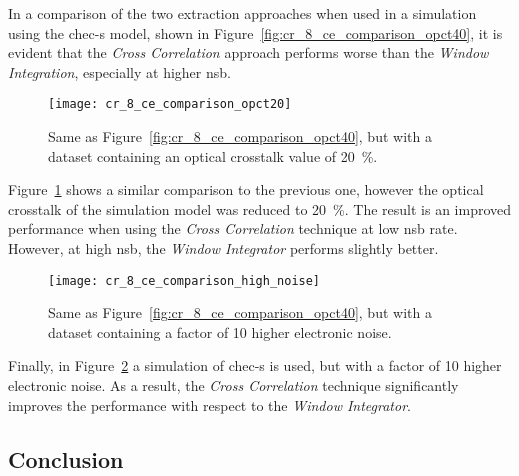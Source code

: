 In a comparison of the two extraction approaches when used in a simulation using the \gls{chec-s} model, shown in Figure~\ref{fig:cr_8_ce_comparison_opct40}, it is evident that the \textit{Cross Correlation} approach performs worse than the \textit{Window Integration}, especially at higher \gls{nsb}.

\begin{figure}
  \texttt{[image: cr\_8\_ce\_comparison\_opct20]}
  \caption[\textit{Charge Resolution} comparison between \textit{Cross Correlation} and \textit{Window Integration} for \textit{MCLab} data with an optical crosstalk of \SI{20}{\percent}.]{Same as Figure~\ref{fig:cr_8_ce_comparison_opct40}, but with a dataset containing an optical crosstalk value of \SI{20}{\percent}.}
  \label{fig:cr_8_ce_comparison_opct20}
\end{figure}

Figure~\ref{fig:cr_8_ce_comparison_opct20} shows a similar comparison to the previous one, however the optical crosstalk of the simulation model was reduced to \SI{20}{\percent}. The result is an improved performance when using the \textit{Cross Correlation} technique at low \gls{nsb} rate. However, at high \gls{nsb}, the \textit{Window Integrator} performs slightly better.

\begin{figure}
  \texttt{[image: cr\_8\_ce\_comparison\_high\_noise]}
  \caption[\textit{Charge Resolution} comparison between \textit{Cross Correlation} and \textit{Window Integration} for \textit{MCLab} data with a high amount of electronic noise.]{Same as Figure~\ref{fig:cr_8_ce_comparison_opct40}, but with a dataset containing a factor of 10 higher electronic noise.}
  \label{fig:cr_8_ce_comparison_high_noise}
\end{figure}

Finally, in Figure~\ref{fig:cr_8_ce_comparison_high_noise} a simulation of \gls{chec-s} is used, but with a factor of 10 higher electronic noise. As a result, the \textit{Cross Correlation} technique significantly improves the performance with respect to the \textit{Window Integrator}.

\subsection{Conclusion}

